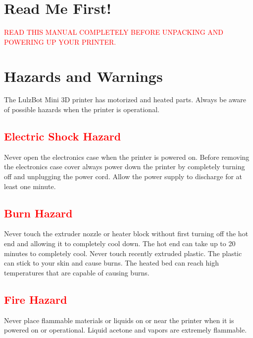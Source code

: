 %
%
%
%
%

\section{Read Me First!}
\textcolor{red}{READ THIS MANUAL COMPLETELY BEFORE UNPACKING AND POWERING UP YOUR PRINTER.}

\section{Hazards and Warnings}

The LulzBot\textsuperscript{\miniscule{\textregistered}} Mini 3D printer has motorized and heated parts.  Always be aware of possible hazards when the printer is operational.

\subsection{\textcolor{red}{Electric Shock Hazard}}
Never open the electronics case when the printer is powered on. Before removing the electronics case cover always power down the printer by completely turning off and unplugging the power cord. Allow the power supply to discharge for at least one minute.

\subsection{\textcolor{red}{Burn Hazard}}
Never touch the extruder nozzle or heater block without first turning off the hot end and allowing it to completely cool down. The hot end can take up to 20 minutes to completely cool. Never touch recently extruded plastic. The plastic can stick to your skin and cause burns. The heated bed can reach high temperatures that are capable of causing burns.

\subsection{\textcolor{red}{Fire Hazard}}
Never place flammable materials or liquids on or near the printer when it is powered on or operational. Liquid acetone and vapors are extremely flammable.

